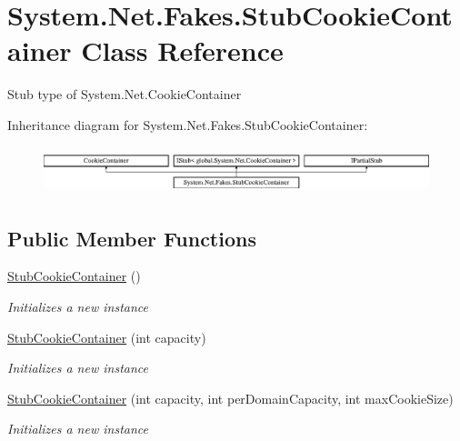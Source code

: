 \hypertarget{class_system_1_1_net_1_1_fakes_1_1_stub_cookie_container}{\section{System.\-Net.\-Fakes.\-Stub\-Cookie\-Container Class Reference}
\label{class_system_1_1_net_1_1_fakes_1_1_stub_cookie_container}
}


Stub type of System.\-Net.\-Cookie\-Container 


Inheritance diagram for System.\-Net.\-Fakes.\-Stub\-Cookie\-Container\-:\begin{figure}[H]
\begin{center}
\leavevmode
\includegraphics[height=1.377614cm]{class_system_1_1_net_1_1_fakes_1_1_stub_cookie_container}
\end{center}
\end{figure}
\subsection*{Public Member Functions}
\begin{DoxyCompactItemize}
\item 
\hyperlink{class_system_1_1_net_1_1_fakes_1_1_stub_cookie_container_ae95363ee28decac1c3e9de31e5bfe8f4}{Stub\-Cookie\-Container} ()
\begin{DoxyCompactList}\small\item\em Initializes a new instance\end{DoxyCompactList}\item 
\hyperlink{class_system_1_1_net_1_1_fakes_1_1_stub_cookie_container_af758db608e5a3b61b699d6ae2417d433}{Stub\-Cookie\-Container} (int capacity)
\begin{DoxyCompactList}\small\item\em Initializes a new instance\end{DoxyCompactList}\item 
\hyperlink{class_system_1_1_net_1_1_fakes_1_1_stub_cookie_container_ad26e775709af17f0ec0784722b805974}{Stub\-Cookie\-Container} (int capacity, int per\-Domain\-Capacity, int max\-Cookie\-Size)
\begin{DoxyCompactList}\small\item\em Initializes a new instance\end{DoxyCompactList}\end{DoxyCompactItemize}
